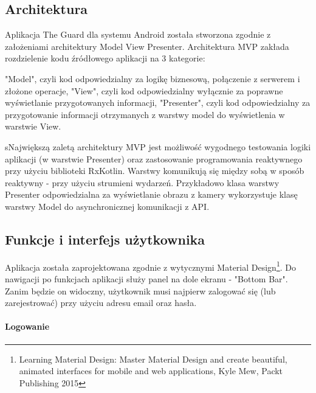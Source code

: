 \subsection*{Architektura}
Aplikacja The Guard dla systemu Android została stworzona zgodnie z założeniami architektury Model View Presenter. Architektura MVP zakłada rozdzielenie kodu źródłowego aplikacji na 3 kategorie:

\textbullet \space "Model", czyli kod odpowiedzialny za logikę biznesową, połączenie z serwerem i złożone operacje,\newline
\textbullet \space "View", czyli kod odpowiedzialny wyłącznie za poprawne wyświetlanie przygotowanych informacji,\newline
\textbullet \space "Presenter", czyli kod odpowiedzialny za przygotowanie informacji otrzymanych z warstwy model do wyświetlenia w warstwie View.\newline

sNajwiększą zaletą architektury MVP jest możliwość wygodnego testowania logiki aplikacji (w warstwie Presenter) oraz zastosowanie programowania reaktywnego przy użyciu biblioteki RxKotlin.
Warstwy komunikują się między sobą w sposób reaktywny - przy użyciu strumieni wydarzeń. Przykładowo klasa warstwy Presenter odpowiedzialna za wyświetlanie obrazu z kamery wykorzystuje klasę warstwy Model do asynchronicznej komunikacji z API.

\subsection*{Funkcje i interfejs użytkownika}
Aplikacja została zaprojektowana zgodnie z wytycznymi Material Design\footnote{Learning Material Design: Master Material Design and create beautiful, animated interfaces for mobile and web applications, Kyle Mew, Packt Publishing 2015}.
Do nawigacji po funkcjach aplikacji służy panel na dole ekranu - "Bottom Bar".
Zanim będzie on widoczny, użytkownik musi najpierw zalogować się (lub zarejestrować) przy użyciu adresu email oraz hasła.

\paragraph{Logowanie}

